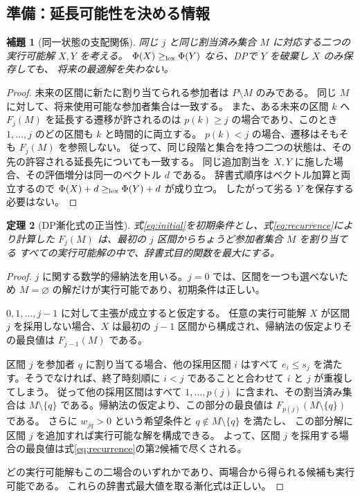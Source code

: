 \documentclass[11pt,a4paper]{ltjsarticle}
\newtheorem{theorem}{定理}[section]
\newtheorem{lemma}[theorem]{補題}
\theoremstyle{definition}
\theoremstyle{remark}
\begin{document}
\subsection{準備：延長可能性を決める情報}
\begin{lemma}[同一状態の支配関係]
同じ $j$ と同じ割当済み集合 $M$ に対応する二つの実行可能解 $X,Y$ を考える。
$\Phi(X)\geq_{\rm lex}\Phi(Y)$ なら、DPで $Y$ を破棄し $X$ のみ保存しても、
将来の最適解を失わない。
\end{lemma}
\begin{proof}
未来の区間に新たに割り当てられる参加者は $P\setminus M$ のみである。
同じ $M$ に対して、将来使用可能な参加者集合は一致する。
また、ある未来の区間 $k$ へ $F_j(M)$ を延長する遷移が許されるのは
$p(k)\geq j$ の場合であり、このとき $1,\ldots,j$ のどの区間も $k$ と時間的に両立する。
$p(k)<j$ の場合、遷移はそもそも $F_j(M)$ を参照しない。
従って、同じ段階と集合を持つ二つの状態は、その先の許容される延長先についても一致する。
同じ追加割当を $X,Y$ に施した場合、その評価増分は同一のベクトル $d$ である。
辞書式順序はベクトル加算と両立するので
$\Phi(X)+d\geq_{\rm lex}\Phi(Y)+d$ が成り立つ。
したがって劣る $Y$ を保存する必要はない。
\end{proof}

\begin{theorem}[DP漸化式の正当性]
式\eqref{eq:initial}を初期条件とし、式\eqref{eq:recurrence}により計算した
$F_j(M)$ は、最初の $j$ 区間からちょうど参加者集合 $M$ を割り当てる
すべての実行可能解の中で、辞書式目的関数を最大にする。
\end{theorem}
\begin{proof}
$j$ に関する数学的帰納法を用いる。$j=0$ では、区間を一つも選べないため
$M=\varnothing$ の解だけが実行可能であり、初期条件は正しい。

$0,1,\ldots,j-1$ に対して主張が成立すると仮定する。
任意の実行可能解 $X$ が区間 $j$ を採用しない場合、$X$ は最初の
$j-1$ 区間から構成され、帰納法の仮定よりその最良値は $F_{j-1}(M)$ である。

区間 $j$ を参加者 $q$ に割り当てる場合、他の採用区間 $i$ はすべて
$e_i\leq s_j$ を満たす。そうでなければ、終了時刻順に $i<j$ であることと合わせて
$i$ と $j$ が重複してしまう。
従って他の採用区間はすべて $1,\ldots,p(j)$ に含まれ、その割当済み集合は
$M\setminus\{q\}$ である。帰納法の仮定より、この部分の最良値は
$F_{p(j)}(M\setminus\{q\})$ である。
さらに $w_{jq}>0$ という希望条件と $q\notin M\setminus\{q\}$ を満たし、
この部分解に区間 $j$ を追加すれば実行可能な解を構成できる。
よって、区間 $j$ を採用する場合の最良値は式\eqref{eq:recurrence}の第2候補で尽くされる。

どの実行可能解もこの二場合のいずれかであり、両場合から得られる候補も実行可能である。
これらの辞書式最大値を取る漸化式は正しい。
\end{proof}
\end{document}
